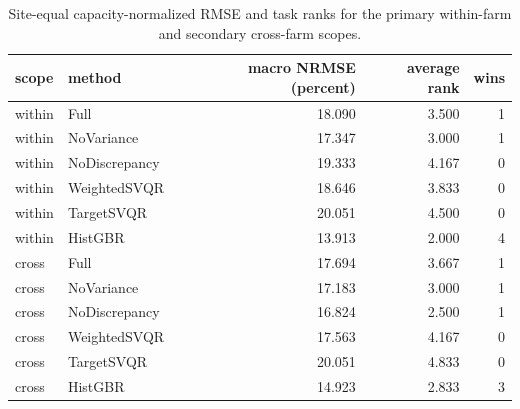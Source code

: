 \begin{table}
\caption{Site-equal capacity-normalized RMSE and task ranks for the primary within-farm and secondary cross-farm scopes.}
\label{tab:selection-v2-scope-summary}
\begin{tabular}{llrrr}
\toprule
scope & method & macro NRMSE (percent) & average rank & wins \\
\midrule
within & Full & 18.090 & 3.500 & 1 \\
within & NoVariance & 17.347 & 3.000 & 1 \\
within & NoDiscrepancy & 19.333 & 4.167 & 0 \\
within & WeightedSVQR & 18.646 & 3.833 & 0 \\
within & TargetSVQR & 20.051 & 4.500 & 0 \\
within & HistGBR & 13.913 & 2.000 & 4 \\
cross & Full & 17.694 & 3.667 & 1 \\
cross & NoVariance & 17.183 & 3.000 & 1 \\
cross & NoDiscrepancy & 16.824 & 2.500 & 1 \\
cross & WeightedSVQR & 17.563 & 4.167 & 0 \\
cross & TargetSVQR & 20.051 & 4.833 & 0 \\
cross & HistGBR & 14.923 & 2.833 & 3 \\
\bottomrule
\end{tabular}
\end{table}
